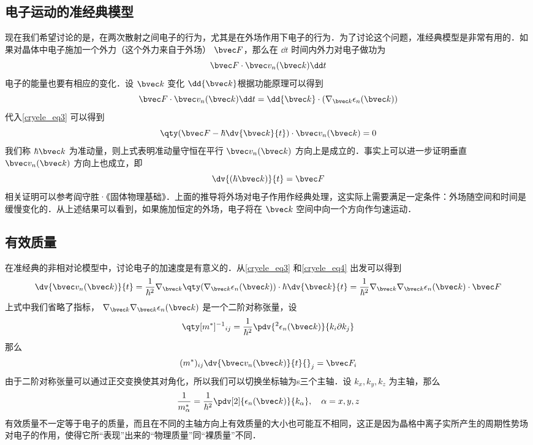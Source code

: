 \subsection{电子运动的准经典模型}
现在我们希望讨论的是，在两次散射之间电子的行为，尤其是在外场作用下电子的行为．为了讨论这个问题，准经典模型是非常有用的．如果对晶体中电子施加一个外力（这个外力来自于外场） $\bvec F$，那么在 $\dd t$ 时间内外力对电子做功为
\begin{equation}
\bvec F\cdot \bvec v_n(\bvec k)\dd t
\end{equation}
电子的能量也要有相应的变化．设 $\bvec k$ 变化 $\dd{\bvec k}$根据功能原理可以得到
\begin{equation}
\bvec F\cdot \bvec v_n(\bvec k)\dd t
=\dd {\bvec k}\cdot (\nabla_{\bvec k}\epsilon_n(\bvec k))
\end{equation}
代入\autoref{cryele_eq3} 可以得到
\begin{equation}
\qty(\bvec F-\hbar\dv{\bvec k}{t})\cdot \bvec v_n(\bvec k)=0
\end{equation}
我们称 $\hbar \bvec k$ 为准动量，则上式表明准动量守恒在平行 $\bvec v_n(\bvec k)$ 方向上是成立的．事实上可以进一步证明垂直 $\bvec v_n(\bvec k)$ 方向上也成立，即
\begin{equation}\label{cryele_eq4}
\dv{(\hbar \bvec k)}{t}=\bvec F
\end{equation}
相关证明可以参考阎守胜·《固体物理基础》\cite{阎守胜}．上面的推导将外场对电子作用作经典处理，这实际上需要满足一定条件：外场随空间和时间是缓慢变化的．从上述结果可以看到，如果施加恒定的外场，电子将在 $\bvec k$ 空间中向一个方向作匀速运动．
\subsection{有效质量}
在准经典的非相对论模型中，讨论电子的加速度是有意义的．从\autoref{cryele_eq3} 和\autoref{cryele_eq4} 出发可以得到
\begin{equation}
\dv{\bvec v_n(\bvec k)}{t}=\frac{1}{\hbar^2}\nabla_{\bvec k}\qty(\nabla_{\bvec k}\epsilon_n(\bvec k) )\cdot \hbar\dv{\bvec k}{t}=\frac{1}{\hbar^2}\nabla_{\bvec k}\nabla_{\bvec k}\epsilon_n(\bvec k) \cdot \bvec F
\end{equation}
上式中我们省略了指标， $\nabla_{\bvec k}\nabla_{\bvec k}\epsilon_n(\bvec k)$ 是一个二阶对称张量，设
\begin{equation}
\qty[m^{*}]^{-1}{}_{ij}=\frac{1}{\hbar^2}\pdv{{}^2\epsilon_n(\bvec k)}{k_i\partial k_j} 
\end{equation}
那么
\begin{equation}
(m^*)_{ij}\dv{\bvec v_n(\bvec k)}{t}{}_j=\bvec F_i
\end{equation}
由于二阶对称张量可以通过正交变换使其对角化，所以我们可以切换坐标轴为s三个主轴．设 $k_x,k_y,k_z$ 为主轴，那么
\begin{equation}\label{cryele_eq5}
\frac{1}{m_\alpha^*}=\frac{1}{\hbar^2}\pdv[2]{\epsilon_n(\bvec k)}{k_\alpha},\quad \alpha=x,y,z
\end{equation}
有效质量不一定等于电子的质量，而且在不同的主轴方向上有效质量的大小也可能互不相同，这正是因为晶格中离子实所产生的周期性势场对电子的作用，使得它所“表现”出来的“物理质量”同“裸质量”不同．

